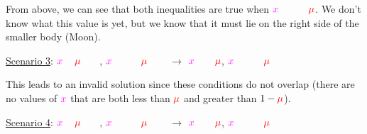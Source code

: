 \documentclass{article}
\newcommand{\cw}{\color{white}}
\newcommand{\cm}{\color{magenta}}
\newcommand{\cred}{\color{red}}
\newcommand{\cb}{\color{blue}}
\newcommand{\cg}{\color{green}}
\newcommand{\cy}{\color{yellow}}
\begin{document}
From above, we can see that both inequalities are true when $\cm x \cw > 1 - \cred \mu \cw$. We don't know what this value is yet, but we know that it must lie on the right side of the smaller body (Moon).

\vspace{\baselineskip}

\underline{Scenario 3}: \quad $\cm x \cw + \cred \mu \cw < 0$, \quad $\cm x \cw - 1 + \cred \mu \cw > 0$ \quad $\longrightarrow$ \quad $\cm x \cw < - \cred \mu \cw$, \quad $\cm x \cw > 1 - \cred \mu \cw$

\begin{center}
    \vspace{7pt}
\end{center}

This leads to an \cy invalid solution \cw since these conditions do not overlap (there are no values of $\cm x \cw$ that are both less than $\cred \mu$ and greater than $1 - \cred \mu$).

\vspace{\baselineskip}

\underline{Scenario 4}: \quad $\cm x \cw + \cred \mu \cw < 0$, \quad $\cm x \cw - 1 + \cred \mu \cw < 0$ \quad $\longrightarrow$ \quad $\cm x \cw < - \cred \mu \cw$, \quad $\cm x \cw < 1 - \cred \mu \cw$
\end{document}
